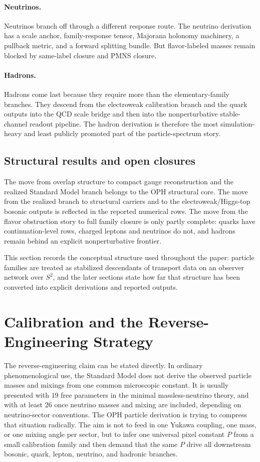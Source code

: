 \documentclass[11pt]{article}
\begin{document}
\paragraph{Neutrinos.}
Neutrinos branch off through a different response route. The neutrino derivation has a scale
anchor, family-response tensor, Majorana holonomy machinery, a pullback metric, and a forward
splitting bundle. But flavor-labeled masses remain blocked by same-label closure and
PMNS closure.

\paragraph{Hadrons.}
Hadrons come last because they require more than the elementary-family branches. They descend
from the electroweak calibration branch and the quark outputs into the QCD scale bridge and then
into the nonperturbative
stable-channel readout pipeline. The hadron derivation is therefore the most simulation-heavy and
least publicly promoted part of the particle-spectrum story.

\subsection{Structural results and open closures}

The move from overlap structure to compact gauge reconstruction
and the realized Standard Model branch belongs to the OPH structural core. The move from
the realized branch to structural carriers and to the electroweak/Higgs-top bosonic outputs is
reflected in the reported numerical rows. The move from the flavor obstruction story to full
family closure is only partly complete: quarks have continuation-level rows,
charged leptons and neutrinos do not, and hadrons remain behind an explicit nonperturbative
frontier.

This section records the conceptual structure used throughout the paper: particle families are
treated as stabilized descendants of transport data on an observer network over \(S^2\), and the
later sections state how far that structure has been converted into explicit derivations and
reported outputs.

\section{Calibration and the Reverse-Engineering Strategy}

The reverse-engineering claim can be stated directly. In ordinary phenomenological use, the
Standard Model does not derive the observed particle masses and mixings from one common
microscopic constant. It is usually presented with \(19\) free parameters
in the minimal massless-neutrino theory, and with at least \(26\) once neutrino masses and mixing
are included, depending on neutrino-sector conventions. The OPH particle derivation is trying to
compress that situation radically. The aim is not to feed in one Yukawa coupling, one mass, or
one mixing angle per sector, but to infer one universal pixel constant \(P\) from a small
calibration family and then demand that the same \(P\) drive all downstream bosonic, quark,
lepton, neutrino, and hadronic branches.
\end{document}
